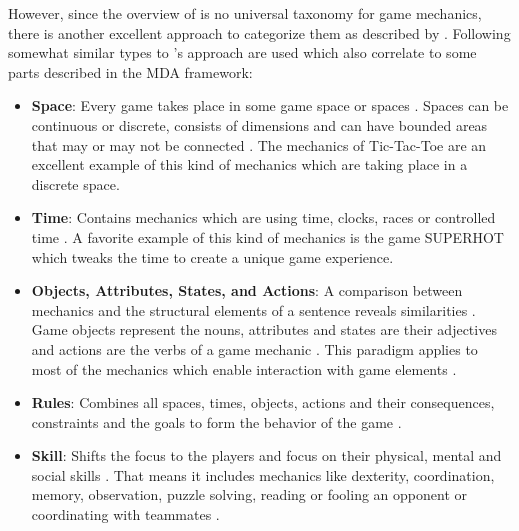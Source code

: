\documentclass[MGS,Master,english]{twbook}%
\begin{document}
However, since the overview of \cite{gameDesign::gameMechanicsAdvancedGameDesign} is no universal taxonomy for game mechanics, there is another excellent approach to categorize them as described by \cite{gameDesign::bookOfLenses}. Following somewhat similar types to \cite{gameDesign::gameMechanicsAdvancedGameDesign}'s approach are used which also correlate to some parts described in the MDA framework:
\begin{itemize}
	\item \textbf{Space}: Every game takes place in some game space or spaces \cite{gameDesign::bookOfLenses}. Spaces can be continuous or discrete, consists of dimensions and can have bounded areas that may or may not be connected \cite{gameDesign::bookOfLenses}. The mechanics of Tic-Tac-Toe are an excellent example of this kind of mechanics which are taking place in a discrete space. 
	\item \textbf{Time}: Contains mechanics which are using time, clocks, races or controlled time \cite{gameDesign::bookOfLenses}. A favorite example of this kind of mechanics is the game SUPERHOT \cite{game::superhot} which tweaks the time to create a unique game experience.
	\item \textbf{Objects, Attributes, States, and Actions}: A comparison between mechanics and the structural elements of a sentence reveals similarities \cite{gameDesign::bookOfLenses}. Game objects represent the nouns, attributes and states are their adjectives and actions are the verbs of a game mechanic \cite{gameDesign::bookOfLenses}. This paradigm applies to most of the mechanics which enable interaction with game elements \cite{gameDesign::bookOfLenses}. 
	\item \textbf{Rules}: Combines all spaces, times, objects, actions and their consequences, constraints and the goals to form the behavior of the game \cite{gameDesign::bookOfLenses}. 
	\item \textbf{Skill}: Shifts the focus to the players and focus on their physical, mental and social skills \cite{gameDesign::bookOfLenses}. That means it includes mechanics like dexterity, coordination, memory, observation, puzzle solving, reading or fooling an opponent or coordinating with teammates \cite{gameDesign::bookOfLenses}.  
\end{itemize}

\end{document}
